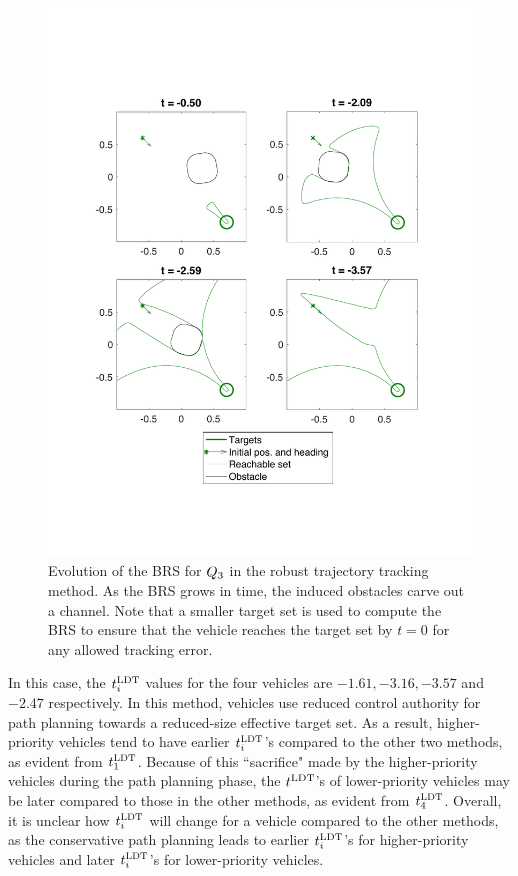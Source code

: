 \begin{figure}
  \centering
  \includegraphics[width=0.95\columnwidth]{"fig/rtt_rs3"}
  \caption{Evolution of the BRS for $Q_3$ in the robust trajectory tracking method. As the BRS grows in time, the induced obstacles carve out a channel. Note that a smaller target set is used to compute the BRS to ensure that the vehicle reaches the target set by $t=0$ for any allowed tracking error.}
  \label{fig:rtt_rs3}
\end{figure}

In this case, the $t^\text{LDT}_i$ values for the four vehicles are $-1.61, -3.16, -3.57$ and $-2.47$ respectively. In this method, vehicles use reduced control authority for path planning towards a reduced-size effective target set. As a result, higher-priority vehicles tend to have earlier $t^\text{LDT}_i$'s compared to the other two methods, as evident from $t^\text{LDT}_1$. Because of this ``sacrifice" made by the higher-priority vehicles during the path planning phase, the $t^\text{LDT}$'s of lower-priority vehicles may be later compared to those in the other methods, as evident from $t^\text{LDT}_4$. Overall, it is unclear how $t^\text{LDT}_i$ will change for a vehicle compared to the other methods, as the conservative path planning leads to earlier $t^\text{LDT}_i$'s for higher-priority vehicles and later $t^\text{LDT}_i$'s for lower-priority vehicles.